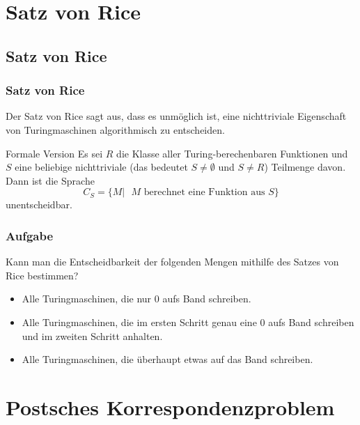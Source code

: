 \section{Satz von Rice}
\subsection{Satz von Rice}
\begin{frame}
\frametitle{Satz von Rice}
Der Satz von Rice sagt aus, dass es unmöglich ist, eine nichttriviale Eigenschaft von Turingmaschinen algorithmisch zu entscheiden.
\begin{block}{Formale Version}
Es sei $R$ die Klasse aller Turing-berechenbaren Funktionen und $S$ eine beliebige nichttriviale (das bedeutet $S \neq \emptyset$ und $S \neq R$) Teilmenge davon. Dann ist die Sprache
$$ C_S = \{ M |\text{ $M$ berechnet eine Funktion aus $S$} \} $$
unentscheidbar. 
\end{block}
\end{frame}

\begin{frame}
\frametitle{Aufgabe}
Kann man die Entscheidbarkeit der folgenden Mengen mithilfe des Satzes von Rice bestimmen?
\begin{itemize}
\item Alle Turingmaschinen, die nur $0$ aufs Band schreiben.
\item Alle Turingmaschinen, die im ersten Schritt genau eine $0$ aufs Band schreiben und im zweiten Schritt anhalten. 
\item Alle Turingmaschinen, die überhaupt etwas auf das Band schreiben.
\end{itemize}
\end{frame}

\section{Postsches Korrespondenzproblem}
